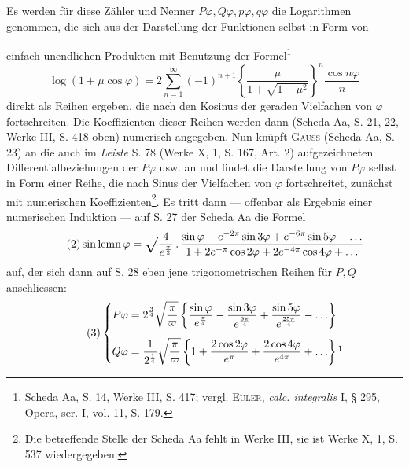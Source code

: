 Es werden für diese Zähler und Nenner \(P\varphi,Q\varphi,p\varphi,q\varphi\) die Logarithmen
genommen, die sich aus der Darstellung der Funktionen selbst in Form von\par
\clearpage{}
\noindent einfach unendlichen Produkten mit Benutzung der Formel\footnote{Scheda Aa, S. 14, Werke III, S. 417; vergl. \textsc{Euler}, \textit{calc. integralis} I, § 295, Opera, ser. I, vol.
11, S. 179.}
\[
\log(1+\mu\cos\varphi)=2\sum_{n=1}^{\infty}(-1)^{n+1}
\left\{\frac{\mu}{1+\sqrt{1-\mu^2}}\right\}^n\frac{\cos n\varphi}{n}
\]
direkt als Reihen ergeben, die nach den Kosinus der geraden Vielfachen von
\(\varphi\) fortschreiten. Die Koeffizienten dieser Reihen werden dann (Scheda Aa,
S. 21, 22, Werke III, S. 418 oben) numerisch angegeben. Nun knüpft \textsc{Gauss}
(Scheda Aa, S. 23) an die auch im \textit{Leiste} S. 78 (Werke X, 1, S. 167, Art. 2)
aufgezeichneten Differentialbeziehungen der \(P\varphi\) usw. an und findet die Darstellung
von \(P\varphi\) selbst in Form einer Reihe, die nach Sinus der Vielfachen
von \(\varphi\) fortschreitet, zunächst mit numerischen Koeffizienten\footnote{Die betreffende Stelle der Scheda Aa fehlt in Werke III, sie ist Werke X, 1, S. 537 wiedergegeben.}.
Es tritt dann
— offenbar als Ergebnis einer numerischen Induktion — auf S. 27 der Scheda
Aa die Formel
\begingroup\makeatletter\tagsleft@true\let\veqno\leqno\makeatother
\begin{equation*}\tag*{(2)}
\operatorname{sin\,lemn}\varphi=
\mathord{\vcenter{\hbox{\Large$\surd$}}}\frac4{e^{\frac{\pi}{2}}}\, .\,
\frac{\sin\varphi-e^{-2\pi}\sin3\varphi+e^{-6\pi}\sin5\varphi-\ldots}
{1+2e^{-\pi}\cos2\varphi+2e^{-4\pi}\cos4\varphi+\ldots}
\end{equation*}
\endgroup
\noindent auf, der sich dann auf S. 28 eben jene trigonometrischen Reihen für \(P,Q\)
anschliessen:
\begingroup\makeatletter\tagsleft@true\let\veqno\leqno\makeatother
\begin{equation*}\tag*{(3)}
\left\{\begin{aligned}
P\varphi&=2^{\frac34}\sqrt{\frac{\pi}{\varpi}}\left\{
\frac{\sin\varphi}{e^{\frac{\pi}{4}}}-\frac{\sin3\varphi}{e^{\frac{9\pi}{4}}}
+\frac{\sin5\varphi}{e^{\frac{25\pi}{4}}}-\ldots\right\}\\[1ex]
Q\varphi&=\frac1{2^{\frac14}}\sqrt{\frac{\pi}{\varpi}}\left\{
1+\frac{2\cos2\varphi}{e^\pi}+\frac{2\cos4\varphi}{e^{4\pi}}+\ldots\right\}\hbox{\footnotemark}
\end{aligned}\right.
\end{equation*}
